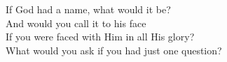 If God had a name, what would it be? \\
And would you call it to his face \\
If you were faced with Him in all His glory? \\
What would you ask if you had just one question?
